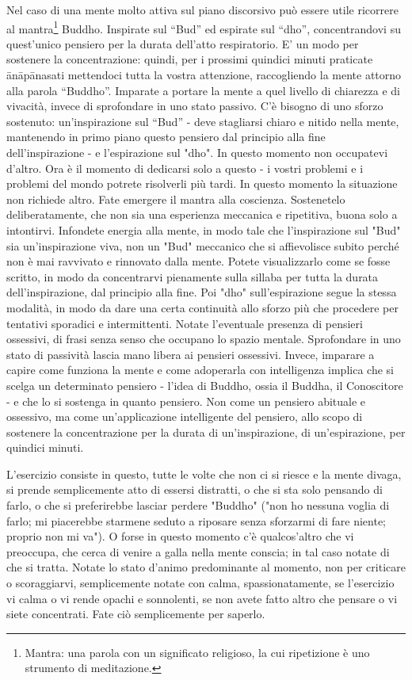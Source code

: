 
Nel caso di una mente molto attiva sul piano discorsivo può essere utile
ricorrere al mantra\footnote{Mantra: una parola con un significato religioso, la cui
ripetizione è uno strumento di meditazione.} Buddho. Inspirate sul “Bud” ed espirate
sul “dho”, concentrandovi su quest'unico pensiero per la durata
dell'atto respiratorio. E' un modo per sostenere la concentrazione:
quindi, per i prossimi quindici minuti praticate ānāpānasati mettendoci
tutta la vostra attenzione, raccogliendo la mente attorno alla parola
“Buddho”. Imparate a portare la mente a quel livello di chiarezza e di
vivacità, invece di sprofondare in uno stato passivo. C'è bisogno di uno
sforzo sostenuto: un'inspirazione sul “Bud” - deve stagliarsi chiaro e
nitido nella mente, mantenendo in primo piano questo pensiero dal
principio alla fine dell'inspirazione - e l'espirazione sul "dho". In
questo momento non occupatevi d'altro. Ora è il momento di dedicarsi
solo a questo - i vostri problemi e i problemi del mondo potrete
risolverli più tardi. In questo momento la situazione non richiede
altro. Fate emergere il mantra alla coscienza. Sostenetelo
deliberatamente, che non sia una esperienza meccanica e ripetitiva,
buona solo a intontirvi. Infondete energia alla mente, in modo tale che
l'inspirazione sul "Bud" sia un'inspirazione viva, non un "Bud"
meccanico che si affievolisce subito perché non è mai ravvivato e
rinnovato dalla mente. Potete visualizzarlo come se fosse scritto, in
modo da concentrarvi pienamente sulla sillaba per tutta la durata
dell'inspirazione, dal principio alla fine. Poi "dho" sull'espirazione
segue la stessa modalità, in modo da dare una certa continuità allo
sforzo più che procedere per tentativi sporadici e intermittenti.
Notate l'eventuale presenza di pensieri ossessivi, di frasi senza senso
che occupano lo spazio mentale. Sprofondare in uno stato di passività
lascia mano libera ai pensieri ossessivi. Invece, imparare a capire come
funziona la mente e come adoperarla con intelligenza implica che si
scelga un determinato pensiero - l'idea di Buddho, ossia il Buddha, il
Conoscitore - e che lo si sostenga in quanto pensiero. Non come un
pensiero abituale e ossessivo, ma come un'applicazione intelligente del
pensiero, allo scopo di sostenere la concentrazione per la durata di
un'inspirazione, di un'espirazione, per quindici minuti.

L'esercizio consiste in questo, tutte le volte che non ci si riesce e la
mente divaga, si prende semplicemente atto di essersi distratti, o che
si sta solo pensando di farlo, o che si preferirebbe lasciar perdere
"Buddho" ("non ho nessuna voglia di farlo; mi piacerebbe starmene seduto
a riposare senza sforzarmi di fare niente; proprio non mi va"). O forse
in questo momento c'è qualcos'altro che vi preoccupa, che cerca di
venire a galla nella mente conscia; in tal caso notate di che si tratta.
Notate lo stato d'animo predominante al momento, non per criticare o
scoraggiarvi, semplicemente notate con calma, spassionatamente, se
l'esercizio vi calma o vi rende opachi e sonnolenti, se non avete fatto
altro che pensare o vi siete concentrati. Fate ciò semplicemente per
saperlo.

